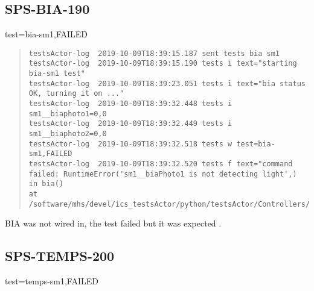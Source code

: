 \subsection{SPS-BIA-190}
\label{sec:tc-190}

test=bia-sm1,FAILED

\begin{quote}
\begin{tiny}
\begin{verbatim}
testsActor-log  2019-10-09T18:39:15.187 sent tests bia sm1
testsActor-log  2019-10-09T18:39:15.190 tests i text="starting bia-sm1 test"
testsActor-log  2019-10-09T18:39:23.051 tests i text="bia status OK, turning it on ..."
testsActor-log  2019-10-09T18:39:32.448 tests i sm1__biaphoto1=0,0
testsActor-log  2019-10-09T18:39:32.449 tests i sm1__biaphoto2=0,0
testsActor-log  2019-10-09T18:39:32.518 tests w test=bia-sm1,FAILED
testsActor-log  2019-10-09T18:39:32.520 tests f text="command failed: RuntimeError('sm1__biaPhoto1 is not detecting light',) in bia()
at /software/mhs/devel/ics_testsActor/python/testsActor/Controllers/enu.py:119"
\end{verbatim}
\end{tiny}
\end{quote}
\noindent BIA was not wired in, the test failed but it was expected .

\subsection{SPS-TEMPS-200}
\label{sec:tc-200}

test=temps-sm1,FAILED


